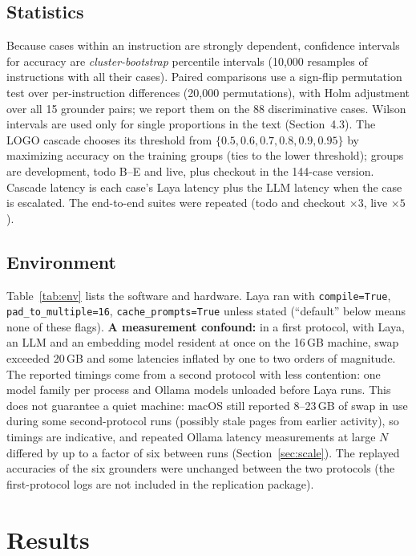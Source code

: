 \documentclass[11pt,a4paper]{article}
\begin{document}
\subsection{Statistics}
Because cases within an instruction are strongly dependent, confidence intervals for accuracy are \emph{cluster-bootstrap} percentile intervals (10{,}000 resamples of instructions with all their cases). Paired comparisons use a sign-flip permutation test over per-instruction differences (20{,}000 permutations), with Holm adjustment over all 15 grounder pairs; we report them on the 88 discriminative cases. Wilson intervals \cite{wilson} are used only for single proportions in the text (Section~4.3). The LOGO cascade chooses its threshold from $\{0.5,0.6,0.7,0.8,0.9,0.95\}$ by maximizing accuracy on the training groups (ties to the lower threshold); groups are development, todo B--E and live, plus checkout in the 144-case version. Cascade latency is each case's Laya latency plus the LLM latency when the case is escalated. The end-to-end suites were repeated (todo and checkout $\times3$, live $\times5$).

\subsection{Environment}\label{sec:env}
Table~\ref{tab:env} lists the software and hardware. Laya ran with \texttt{compile=True}, \texttt{pad\_to\_multiple=16}, \texttt{cache\_prompts=True} unless stated (``default'' below means none of these flags). \textbf{A measurement confound:} in a first protocol, with Laya, an LLM and an embedding model resident at once on the 16\,GB machine, swap exceeded 20\,GB and some latencies inflated by one to two orders of magnitude. The reported timings come from a second protocol with less contention: one model family per process and Ollama models unloaded before Laya runs. This does not guarantee a quiet machine: macOS still reported 8--23\,GB of swap in use during some second-protocol runs (possibly stale pages from earlier activity), so timings are indicative, and repeated Ollama latency measurements at large $N$ differed by up to a factor of six between runs (Section~\ref{sec:scale}). The replayed accuracies of the six grounders were unchanged between the two protocols (the first-protocol logs are not included in the replication package).

\section{Results}
\end{document}
